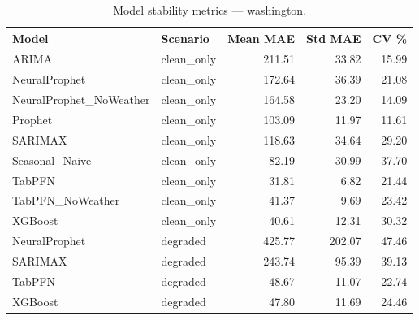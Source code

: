 \begin{table}[h]
\centering
\caption{Model stability metrics — washington.}
\label{tab:stability_washington}
\begin{tabular}{llrrr}
\toprule
Model & Scenario & Mean MAE & Std MAE & CV \% \\
\midrule
ARIMA & clean\_only & 211.51 & 33.82 & 15.99 \\
NeuralProphet & clean\_only & 172.64 & 36.39 & 21.08 \\
NeuralProphet_NoWeather & clean\_only & 164.58 & 23.20 & 14.09 \\
Prophet & clean\_only & 103.09 & 11.97 & 11.61 \\
SARIMAX & clean\_only & 118.63 & 34.64 & 29.20 \\
Seasonal_Naive & clean\_only & 82.19 & 30.99 & 37.70 \\
TabPFN & clean\_only & 31.81 & 6.82 & 21.44 \\
TabPFN_NoWeather & clean\_only & 41.37 & 9.69 & 23.42 \\
XGBoost & clean\_only & 40.61 & 12.31 & 30.32 \\
NeuralProphet & degraded & 425.77 & 202.07 & 47.46 \\
SARIMAX & degraded & 243.74 & 95.39 & 39.13 \\
TabPFN & degraded & 48.67 & 11.07 & 22.74 \\
XGBoost & degraded & 47.80 & 11.69 & 24.46 \\
\bottomrule
\end{tabular}
\end{table}
